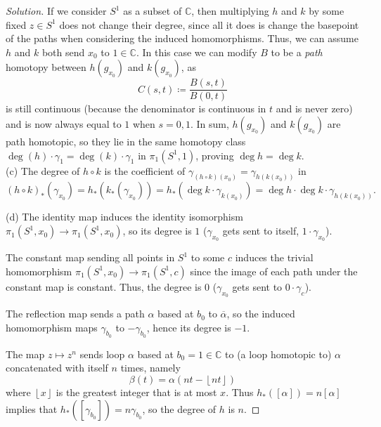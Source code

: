 \documentclass[10pt]{article}
\providecommand{\ol}{\overline}
\providecommand{\floor}[1]{\left\lfloor #1 \right\rfloor}
\providecommand{\CC}{\mathbb C}
\newenvironment{soln}{\begin{proof}[Solution]}{\end{proof}}
\begin{document}
\begin{soln}
    If we consider $S^1$ as a subset of $\CC$, then
    multiplying $h$ and $k$ by some fixed $z\in S^1$
    does not change their degree, since all it does is change the basepoint
    of the paths when considering the induced homomorphisms.
    Thus, we can assume $h$ and $k$ both send $x_0$ to $1\in\CC$.
    In this case we can modify $B$ to be a \emph{path} homotopy
    between $h(g_{x_0})$ and $k(g_{x_0})$, as
    \begin{equation*}
	C(s,t)\coloneq\frac{B(s,t)}{B(0,t)}
    \end{equation*}
    is still continuous (because the denominator is continuous in $t$
    and is never zero) and is now always equal to $1$ when $s = 0,1$.
    In sum, $h(g_{x_0})$ and $k(g_{x_0})$ are path homotopic,
    so they lie in the same homotopy class
    $\deg(h)\cdot\gamma_1 = \deg(k)\cdot\gamma_1$
    in $\pi_1(S^1,1)$, proving $\deg h = \deg k$.
    \\

    (c) The degree of $h\circ k$
    is the coefficient of $\gamma_{(h\circ k)(x_0)} = \gamma_{h(k(x_0))}$ in
    \begin{equation*}
	(h\circ k)_*(\gamma_{x_0}) = h_*(k_*(\gamma_{x_0}))
	= h_*(\deg k\cdot \gamma_{k(x_0)})
	= \boxed{\deg h\cdot\deg k}\cdot \gamma_{h(k(x_0))}.
    \end{equation*}

    (d) The identity map induces the identity isomorphism
    $\pi_1(S^1,x_0)\to\pi_1(S^1,x_0)$, so its degree is $\boxed 1$
    ($\gamma_{x_0}$ gets sent to itself, $1\cdot \gamma_{x_0}$).

    The constant map sending all points in $S^1$ to some $c$
    induces the trivial homomorphism $\pi_1(S^1,x_0)\to\pi_1(S^1,c)$
    since the image of each path under the constant map is constant.
    Thus, the degree is $\boxed 0$
    ($\gamma_{x_0}$ gets sent to $0\cdot\gamma_{c}$).

    The reflection map sends a path $\alpha$ based at $b_0$ to $\ol\alpha$,
    so the induced homomorphism maps $\gamma_{b_0}$ to $-\gamma_{b_0}$,
    hence its degree is $\boxed{-1}$.

    The map $z\mapsto z^n$ sends loop $\alpha$ based at $b_0 = 1\in\CC$ to
    (a loop homotopic to) $\alpha$ concatenated with itself $n$ times, namely
    \begin{equation*}
	\beta(t) = \alpha(nt - \floor{nt})
    \end{equation*}
    where $\floor x$ is the greatest integer that is at most $x$.
    Thus $h_*([\alpha]) = n[\alpha]$ implies that
    $h_*([\gamma_{b_0}]) = n\gamma_{b_0}$, so the degree of $h$ is $\boxed n$.
\end{soln}
\end{document}
